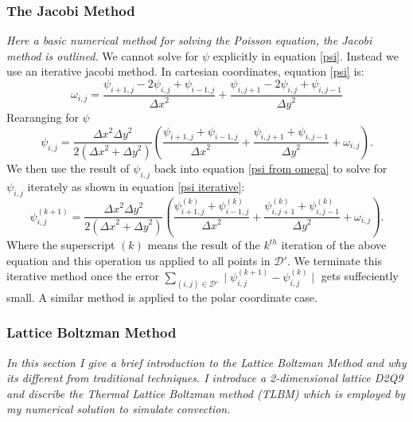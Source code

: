 \documentclass{article}
\begin{document}
\subsubsection*{The Jacobi Method}
{\it{Here a basic numerical method for solving the Poisson equation, the Jacobi method is outlined.}}
\vspace{0.3cm}
\newline
We cannot solve for $\psi$ explicitly in equation \ref{psi}. Instead we use an iterative jacobi method. In cartesian coordinates, equation \ref{psi} is:
\begin{equation}
	\omega_{i,j} = \frac{\psi_{i+1,j} - 2 \psi_{i,j} + \psi_{i-1,j}  }{{\Delta x}^2} + \frac{\psi_{i,j+1} - 2 \psi_{i,j} + \psi_{i,j-1}  }{{\Delta y}^2}
	\label{psi disc}
\end{equation}
Rearanging for $\psi$
\begin{equation}
	\psi_{i,j} = \frac{{\Delta x}^2 {\Delta y}^2  }{2({\Delta x}^2  + {\Delta y}^2)} (\frac{\psi_{i+1,j} +\psi_{i-1,j} }{{\Delta x}^2} + \frac{\psi_{i,j+1} +\psi_{i,j-1}  }{{\Delta y}^2 }  + \omega_{i,j}).
	\label{psi from omega}
\end{equation}
We then use the result of $\psi_{i,j}$ back into equation \ref{psi from omega} to solve for $\psi_{i,j}$ iterately as shown in equation \ref{psi iterative}:
\begin{equation}
	\psi_{i,j}^{(k+1)} = \frac{{\Delta x}^2 {\Delta y}^2  }{2({\Delta x}^2  + {\Delta y}^2)} (\frac{\psi_{i+1,j}^{(k)} +\psi_{i-1,j}^{(k)}  }{{\Delta x}^2} + \frac{\psi_{i,j+1}^{(k)} +\psi_{i,j-1}^{(k)}  }{{\Delta y}^2 } + \omega_{i,j}).
	\label{psi iterative}
\end{equation}
Where the superscript $(k)$ means the result of the $k^{th}$ iteration of the above equation and this operation us applied to all points in $\mathcal{D}'$.
 We terminate this iterative method once the error $\sum_{(i,j) \in \mathcal{D'}} \mid \psi_{i,j}^{(k+1)} - \psi_{i,j}^{(k)} \mid$ gets suffeciently small. A similar method is applied to the polar coordinate case. 

\subsubsection*{Lattice Boltzman Method}
{\it{In this section I give a brief introduction to the Lattice Boltzman Method and why its different from traditional techniques. I introduce a 2-dimensional lattice D2Q9 and discribe the Thermal Lattice Boltzman method (TLBM) which is employed by my numerical solution to simulate convection.}}
\vspace{0.3cm}
\end{document}
